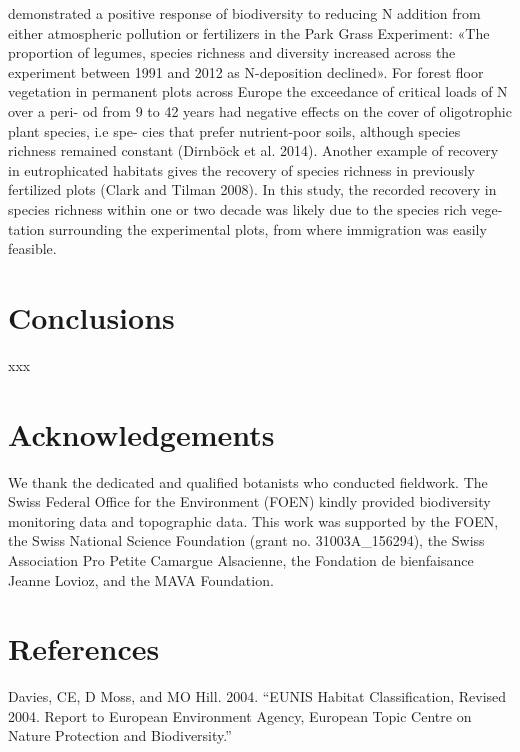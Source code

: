 \documentclass[fleqn,10pt,lineno]{wlpeerj} %
\theoremstyle{definition}
\theoremstyle{definition}
\theoremstyle{definition}
\theoremstyle{remark}
\begin{document}
\begin{itemize}
  demonstrated a positive response of biodiversity to reducing N
  addition from either atmospheric pollution or fertilizers in the Park
  Grass Experiment: «The proportion of legumes, species richness and
  diversity increased across the experiment between 1991 and 2012 as
  N-deposition declined». For forest floor vegetation in permanent plots
  across Europe the exceedance of critical loads of N over a peri- od
  from 9 to 42 years had negative effects on the cover of oligotrophic
  plant species, i.e spe- cies that prefer nutrient-poor soils, although
  species richness remained constant (Dirnböck et al. 2014). Another
  example of recovery in eutrophicated habitats gives the recovery of
  species richness in previously fertilized plots (Clark and Tilman
  2008). In this study, the recorded recovery in species richness within
  one or two decade was likely due to the species rich vege- tation
  surrounding the experimental plots, from where immigration was easily
  feasible.
\end{itemize}

\section*{Conclusions}\label{conclusions}

xxx

\section*{Acknowledgements}\label{acknowledgements}

We thank the dedicated and qualified botanists who conducted fieldwork.
The Swiss Federal Office for the Environment (FOEN) kindly provided
biodiversity monitoring data and topographic data. This work was
supported by the FOEN, the Swiss National Science Foundation (grant no.
31003A\_156294), the Swiss Association Pro Petite Camargue Alsacienne,
the Fondation de bienfaisance Jeanne Lovioz, and the MAVA Foundation.

\section*{References}\label{references}

\hypertarget{refs}{}
\hypertarget{ref-Davies2004}{}
Davies, CE, D Moss, and MO Hill. 2004. ``EUNIS Habitat Classification,
Revised 2004. Report to European Environment Agency, European Topic
Centre on Nature Protection and Biodiversity.''
\end{document}
